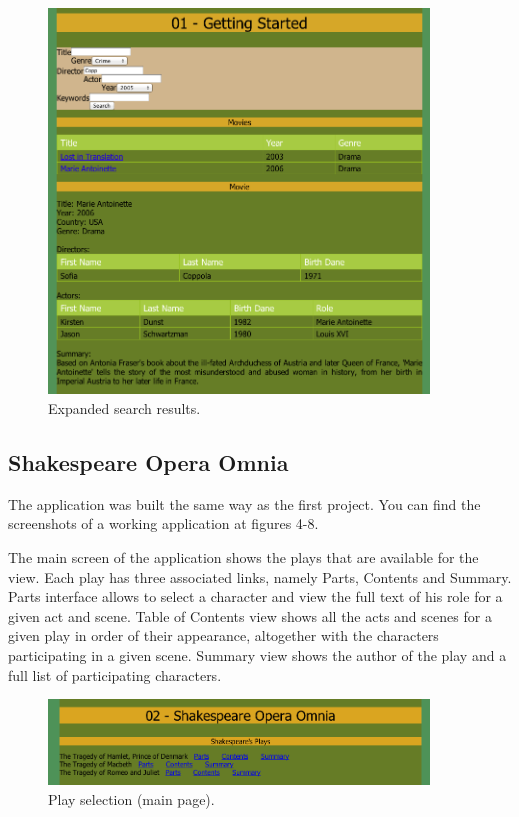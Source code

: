 \documentclass[a4paper, notitlepage]{article}
\begin{document}
\begin{figure}[ht]
\begin{center}
\includegraphics[width=0.9\textwidth]{01-3.png}
\caption{Expanded search results.}
\label{fig:01-3}
\end{center}
\end{figure}

\clearpage
\subsection{Shakespeare Opera Omnia}

The application was built the same way as the first project. You can find the screenshots of a working application at figures 4-8.

The main screen of the application shows the plays that are available for the view. Each play has three associated links, namely Parts, Contents and Summary. Parts interface allows to select a character and view the full text of his role for a given act and scene. Table of Contents view shows all the acts and scenes for a given play in order of their appearance, altogether with the characters participating in a given scene. Summary view shows the author of the play and a full list of participating characters.

\begin{figure}[ht]
\begin{center}
\includegraphics[width=0.9\textwidth]{02-1.png}
\caption{Play selection (main page).}
\label{fig:02-1}
\end{center}
\end{figure}
\end{document}
